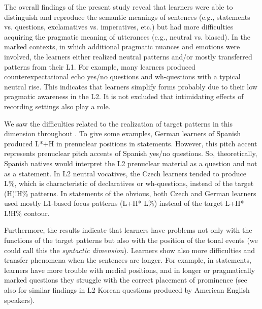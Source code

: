 The overall findings of the present study reveal that learners were able to distinguish and reproduce the semantic meanings of sentences (e.g., statements vs. questions, exclamatives vs. imperatives, etc.) but had more difficulties acquiring the pragmatic meaning of utterances (e.g., neutral vs. biased). In the marked contexts, in which additional pragmatic nuances and emotions were involved, the learners either realized neutral patterns and/or mostly transferred patterns from their L1. For example, many learners produced counterexpectational echo yes/no questions and wh-questions with a typical neutral rise. This indicates that learners simplify forms probably due to their low pragmatic awareness in the L2. It is not excluded that intimidating effects of recording settings also play a role.



We saw the difficulties related to the realization of target patterns in this dimension throughout . To give some examples, German learners of Spanish produced L*+H in prenuclear positions in statements. However, this pitch accent represents prenuclear pitch accents of Spanish yes/no questions. So, theoretically, Spanish natives would interpret the L2 prenuclear material as a question and not as a statement. In L2 neutral vocatives, the Czech learners tended to produce L\%, which is characteristic of declaratives or wh-questions, instead of the target (H)!H\% patterns. In statements of the obvious, both Czech and German learners used mostly L1-based focus patterns (L+H* L\%) instead of the target L+H* L!H\% contour.



Furthermore, the results indicate that learners have problems not only with the functions of the target patterns but also with the position of the tonal events (we could call this the \textit{syntactic dimension}). Learners show also more difficulties and transfer phenomena when the sentences are longer. For example, in statements, learners have more trouble with medial positions, and in longer or pragmatically marked questions they struggle with the correct placement of prominence (see also \citealt{JunOh2000} for similar findings in L2 Korean questions produced by American English speakers).



